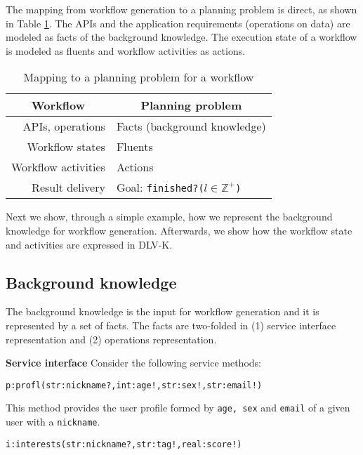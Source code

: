 \documentclass{acm_proc_article-sp}
\begin{document}
The mapping from workflow generation to a planning problem is direct, as shown in Table \ref{tab:mappingQW-PP}. The APIs and the application requirements (operations on data) are modeled as facts of the background knowledge. The execution state of a workflow is modeled as fluents and workflow activities as actions.

	\begin{table}
	   \begin{center}
	      \begin{tabular}{|r|l|}
	         \hline
	         \multicolumn{1}{|c|}{\textbf{Workflow }}& \multicolumn{1}{c|}{\textbf{Planning problem}} \\
	         \hline
	         APIs, operations & Facts (background knowledge) \\
	         \hline
	         Workflow states & Fluents \\
	         \hline
	         Workflow activities & Actions \\
	         \hline
	         Result delivery & Goal: \texttt{finished?(}$l \in \mathds{Z}^{+}$\texttt{)} \\
	         \hline
	      \end{tabular}
	   \end{center} 
	   \caption{Mapping to a planning problem for a workflow}
	   \label{tab:mappingQW-PP}
	\end{table}

Next we show, through a simple example, how we represent the background knowledge for workflow generation. Afterwards, we show how the workflow state and activities are expressed in DLV-K.
         
\subsection{Background knowledge} \label{subsec:kb}
The background knowledge is the input for workflow generation and it is represented by a set of facts. The facts are two-folded in (1) service interface representation and (2) operations representation.
               
\textbf{Service interface} Consider the following service methods:

{\footnotesize\texttt{p:profl(str:nickname?,int:age!,str:sex!,str:email!)}}

This method provides the user profile formed by \texttt{age, sex} and \texttt{email} of a given user with a \texttt{nickname}.

{\footnotesize\texttt{i:interests(str:nickname?,str:tag!,real:score!)}}
\end{document}

